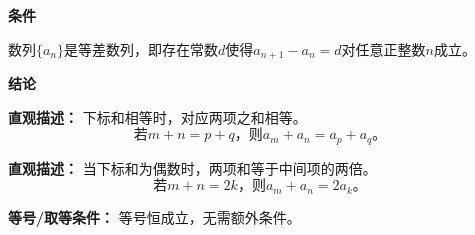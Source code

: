 \begin{statementbox}

\textbf{\textcolor{CStatement}{条件}}
\begin{description}[style=nextline, leftmargin=2.8em, labelsep=0.5em, itemsep=0.35em]
    \item[\textbf{\textcolor{CStatement}{条件1（等差数列定义）：}}] 数列$\{a_n\}$是等差数列，即存在常数$d$使得$a_{n+1}-a_n=d$对任意正整数$n$成立。
\end{description}

\textbf{\textcolor{CStatement}{结论}}
\begin{description}[style=nextline, leftmargin=2.8em, labelsep=0.5em, itemsep=0.45em]
    \item[\textbf{\textcolor{CStatement}{结论一（下标和性质）：}}]
    \textbf{\textcolor{CStatement}{直观描述：}} 下标和相等时，对应两项之和相等。
    \[
    \text{若}m+n=p+q\text{，则}a_m+a_n=a_p+a_q\text{。}
    \]

    \item[\textbf{\textcolor{CStatement}{推广结论（中项特例）：}}]
    \textbf{\textcolor{CStatement}{直观描述：}} 当下标和为偶数时，两项和等于中间项的两倍。
    \[
    \text{若}m+n=2k\text{，则}a_m+a_n=2a_k\text{。}
    \]
\end{description}

\textbf{\textcolor{CStatement}{等号/取等条件：}} 等号恒成立，无需额外条件。

\end{statementbox}
